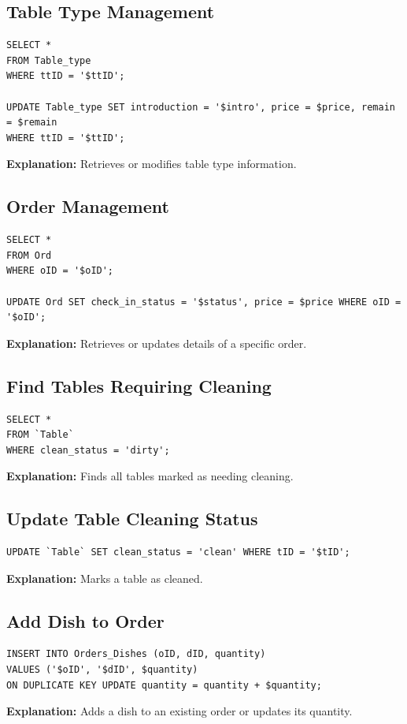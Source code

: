 \documentclass[12pt]{article}
\begin{document}
\subsection{Table Type Management}
\begin{lstlisting}
SELECT * 
FROM Table_type 
WHERE ttID = '$ttID';

UPDATE Table_type SET introduction = '$intro', price = $price, remain = $remain
WHERE ttID = '$ttID';
\end{lstlisting}
\textbf{Explanation:} Retrieves or modifies table type information.

\subsection{Order Management}
\begin{lstlisting}
SELECT * 
FROM Ord 
WHERE oID = '$oID';

UPDATE Ord SET check_in_status = '$status', price = $price WHERE oID = '$oID';
\end{lstlisting}
\textbf{Explanation:} Retrieves or updates details of a specific order.

\subsection{Find Tables Requiring Cleaning}
\begin{lstlisting}
SELECT * 
FROM `Table` 
WHERE clean_status = 'dirty';
\end{lstlisting}
\textbf{Explanation:} Finds all tables marked as needing cleaning.

\subsection{Update Table Cleaning Status}
\begin{lstlisting}
UPDATE `Table` SET clean_status = 'clean' WHERE tID = '$tID';
\end{lstlisting}
\textbf{Explanation:} Marks a table as cleaned.

\subsection{Add Dish to Order}
\begin{lstlisting}
INSERT INTO Orders_Dishes (oID, dID, quantity)
VALUES ('$oID', '$dID', $quantity)
ON DUPLICATE KEY UPDATE quantity = quantity + $quantity;
\end{lstlisting}
\textbf{Explanation:} Adds a dish to an existing order or updates its quantity.
\end{document}
